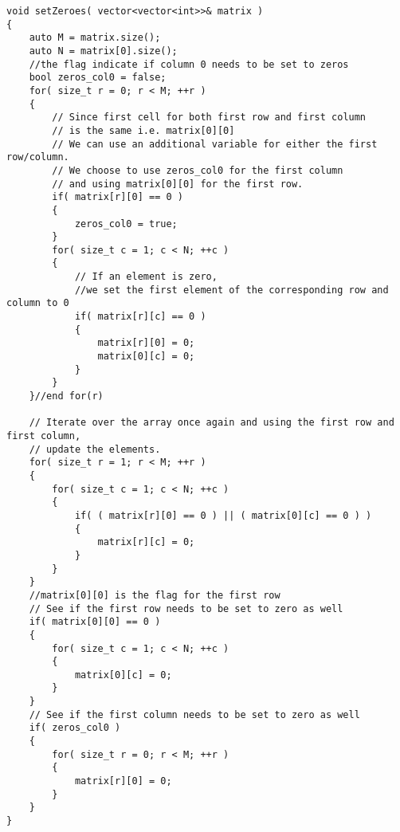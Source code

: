 \setcounter{lstlisting}{0}
\begin{lstlisting}[style=customc, caption={Constant Space}]
void setZeroes( vector<vector<int>>& matrix )
{
    auto M = matrix.size();
    auto N = matrix[0].size();
    //the flag indicate if column 0 needs to be set to zeros
    bool zeros_col0 = false;
    for( size_t r = 0; r < M; ++r )
    {
        // Since first cell for both first row and first column
        // is the same i.e. matrix[0][0]
        // We can use an additional variable for either the first row/column.
        // We choose to use zeros_col0 for the first column
        // and using matrix[0][0] for the first row.
        if( matrix[r][0] == 0 )
        {
            zeros_col0 = true;
        }
        for( size_t c = 1; c < N; ++c )
        {
            // If an element is zero,
            //we set the first element of the corresponding row and column to 0
            if( matrix[r][c] == 0 )
            {
                matrix[r][0] = 0;
                matrix[0][c] = 0;
            }
        }
    }//end for(r)

    // Iterate over the array once again and using the first row and first column,
    // update the elements.
    for( size_t r = 1; r < M; ++r )
    {
        for( size_t c = 1; c < N; ++c )
        {
            if( ( matrix[r][0] == 0 ) || ( matrix[0][c] == 0 ) )
            {
                matrix[r][c] = 0;
            }
        }
    }
    //matrix[0][0] is the flag for the first row
    // See if the first row needs to be set to zero as well
    if( matrix[0][0] == 0 )
    {
        for( size_t c = 1; c < N; ++c )
        {
            matrix[0][c] = 0;
        }
    }
    // See if the first column needs to be set to zero as well
    if( zeros_col0 )
    {
        for( size_t r = 0; r < M; ++r )
        {
            matrix[r][0] = 0;
        }
    }
}
\end{lstlisting}